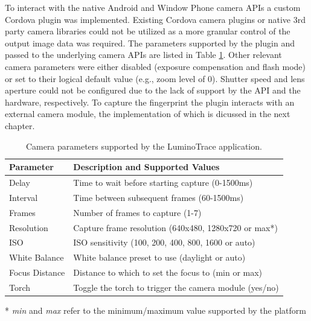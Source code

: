 \documentclass[thesis.tex]{subfiles}
\begin{document}
To interact with the native Android and Window Phone camera APIs a custom Cordova plugin was implemented. Existing Cordova camera plugins or native 3rd party camera libraries could not be utilized as a more granular control of the output image data was required. The parameters supported by the plugin and passed to the underlying camera APIs are listed in Table \ref{table:camera-parameters}. Other relevant camera parameters were either disabled (exposure compensation and flash mode) or set to their logical default value (e.g., zoom level of 0). Shutter speed and lens aperture could not be configured due to the lack of support by the API and the hardware, respectively. To capture the fingerprint the plugin interacts with an external camera module, the implementation of which is dicussed in the next chapter.

\begin{table}[ht]
	\vspace{-3mm}
	\caption{Camera parameters supported by the LuminoTrace application.} \label{table:camera-parameters}
	\vspace{-2mm}
	\begin{center}
	\begin{tabular}{| m{2.75cm} | m{9.75cm} |}

		\hline
		\textbf{Parameter}	& \textbf{Description and Supported Values} \\ \hline
		Delay				& Time to wait before starting capture (0-1500ms) \\
		\hline
		Interval 			& Time between subsequent frames (60-1500ms) \\
		\hline
		Frames 				& Number of frames to capture (1-7) \\
		\hline
		Resolution 			& Capture frame resolution (640x480, 1280x720 or max\footnotesize{*}) \\
		\hline
		ISO 				& ISO sensitivity (100, 200, 400, 800, 1600 or auto) \\
		\hline
		White Balance		& White balance preset to use (daylight or auto) \\
		\hline
		Focus Distance		& Distance to which to set the focus to (min or max) \\
		\hline
		Torch 			& Toggle the torch to trigger the camera module (yes/no) \\
		\hline
	\end{tabular}
	\end{center}
	\vspace{-3mm}
	\scriptsize{*} \small{\emph{min} and \emph{max} refer to the minimum/maximum value supported by the platform}
\end{table}
\end{document}
